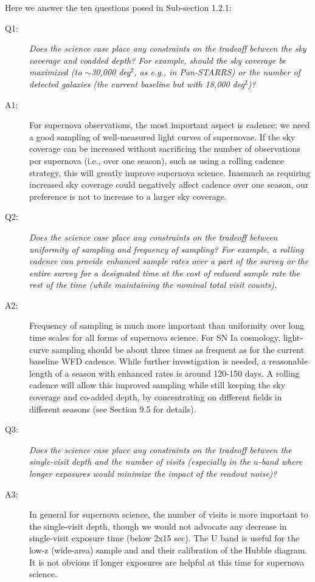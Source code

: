 Here we answer the ten questions posed in Sub-section 1.2.1:

\begin{description}
\item[Q1:] {\it Does the science case place any constraints on the
tradeoff between the sky coverage and coadded depth? For example, should
the sky coverage be maximized (to $\sim$30,000 deg$^2$, as e.g., in
Pan-STARRS) or the number of detected galaxies (the current baseline but
with 18,000 deg$^2$)?}

\item[A1:] For supernova observations, the most important aspect is cadence: we need a
good sampling of well-measured light curves of supernovae. If the sky
coverage can be increased without sacrificing the number of observations
per supernova (i.e., over one season), such as using a rolling cadence
strategy, this will greatly improve supernova science. Inasmuch as
requiring increased sky coverage could negatively affect cadence over one
season, our preference is not to increase to a larger sky coverage.

\item[Q2:] {\it Does the science case place any constraints on the
tradeoff between uniformity of sampling and frequency of  sampling? For
example, a rolling cadence can provide enhanced sample rates over a part
of the survey or the entire survey for a designated time at the cost of
reduced sample rate the rest of the time (while maintaining the nominal
total visit counts).}


\item[A2:] Frequency of sampling is much more important than uniformity over long time
scales for all forms of supernova science. For SN Ia cosmology, light-curve
sampling should be about three times as frequent as for the current
baseline WFD cadence. While further investigation is needed, a reasonable
length of a season with enhanced rates is around 120-150 days. A rolling
cadence will allow this improved sampling while still keeping the sky
coverage and co-added depth, by concentrating on different fields in
different seasons (see Section 9.5 for details).

\item[Q3:] {\it Does the science case place any constraints on the
tradeoff between the single-visit depth and the number of visits
(especially in the $u$-band where longer exposures would minimize the
impact of the readout noise)?}

\item[A3:] In general for supernova science, the number of visits is more important to
the single-visit depth, though we would not advocate any decrease in
single-visit exposure time (below 2x15 sec). The U band  is useful for the
low-z (wide-area) sample and and their calibration of the Hubble diagram.
It is not obvious if longer exposures are helpful at this time for
supernova science.


\end{description}
